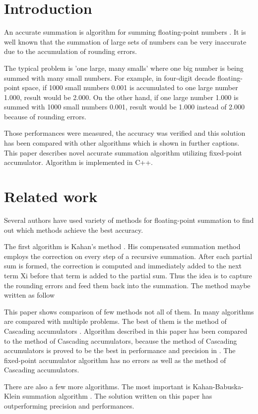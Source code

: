 \documentclass[conference]{IEEEtran}
\begin{document}
\section{Introduction}
An accurate summation \cite{Higham} is algorithm for summing 
floating-point numbers \cite{WhatShouldKnowAboutFP}. It is well known that the summation 
of large sets of numbers can be very inaccurate due
to the accumulation of rounding errors. 
\par
The typical problem is 'one large, many smalls' \cite{ComparisonOfMethods} 
where one big number is being summed with many small numbers. 
For example, in four-digit decade floating-point space,
if 1000 small numbers 0.001 is accumulated to one large 
number 1.000, result would be 2.000. On the other hand,
if one large number 1.000 is summed with 1000 small numbers 0.001,
result would be 1.000 instead of 2.000 because of rounding errors.
\par
Those performances were measured, the accuracy was verified and this 
solution has been compared with other algorithms which is 
shown in further captions. This paper describes novel accurate 
summation algorithm utilizing fixed-point accumulator.
Algorithm is implemented in C++.


\section{Related work}
Several authors have used variety of methods for floating-point 
summation to find out which methods achieve the best accuracy. 
\par
The first algorithm is Kahan's method \cite{ComparisonOfMethods}. 
His compensated summation method employs the correction 
on every step of a recursive summation. After each partial 
sum is formed, the correction is computed and immediately added 
to the next term Xi before that term is added to the partial
sum. Thus the idea is to capture the rounding errors and feed 
them back into the summation. The method maybe written as follow
\par 
This paper shows comparison of few methods not all of them.
In \cite{ComparisonOfMethods} many algorithms are compared with multiple problems. 
The best of them is the method of Cascading accumulators \cite{CascadingAccumulators}. 
Algorithm described in this paper has been compared to the method of Cascading 
accumulators, because the method of Cascading accumulators is proved 
to be the best in performance and precision in \cite{ComparisonOfMethods}.
The fixed-point accumulator algorithm has no errors as well as the method of Cascading 
accumulators.
\par
There are also a few more algorithms. 
The most important is Kahan-Babuska-Klein summation algorithm \cite{KahanBabuskaKlein}.
The solution written on this paper has outperforming precision and performances.
\end{document}
